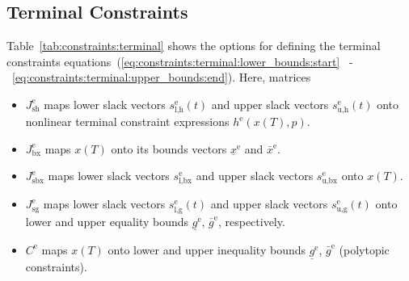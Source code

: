 \documentclass[english]{article}
\newcommand{\ind}[1]{_{\textrm{#1}}}
\newcommand{\terminal}{^{\textrm{e}}}
\begin{document}
\subsection{Terminal Constraints}\label{sec:constraints:terminal}
%
Table~\ref{tab:constraints:terminal} shows the options for defining the terminal constraints equations~(\ref{eq:constraints:terminal:lower_bounds:start} ~-~\ref{eq:constraints:terminal:upper_bounds:end}).
Here, matrices
\begin{itemize}
    \item $J\ind{sh}\terminal$ maps lower slack vectors $s\ind{l,h}\terminal(t)$ and upper slack vectors $s\ind{u,h}\terminal(t)$ onto nonlinear terminal constraint expressions $h\terminal(x(T), p)$.
    \item $J\ind{bx}\terminal$ maps $x(T)$ onto its bounds vectors $\underline{x}\terminal$ and $\bar{x}\terminal$.
    \item $J\ind{sbx}\terminal$ maps lower slack vectors $s\ind{l,bx}\terminal$ and upper slack vectors $s\ind{u,bx}\terminal$ onto $x(T)$.
    \item $J\ind{sg}\terminal$ maps lower slack vectors $s\ind{l,g}\terminal(t)$ and upper slack vectors $s\ind{u,g}\terminal(t)$ onto lower and upper equality bounds $\underline{g}\terminal$, $\bar{g}\terminal$, respectively.
    \item $C\terminal$ maps $x(T)$ onto lower and upper inequality bounds $\underline{g}\terminal$, $\bar{g}\terminal$ (polytopic constraints).
\end{itemize}
%
\end{document}
